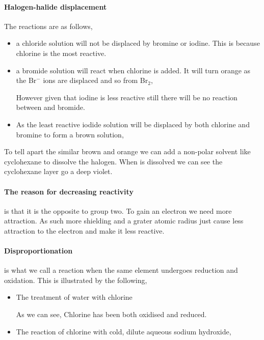 	\paragraph{Halogen-halide displacement} The reactions are as follows,
	\begin{itemize}
		\item a chloride solution will not be displaced by bromine or iodine. This is because chlorine is the most reactive.
		\item a bromide solution will react when chlorine is added. It will turn orange as the Br$^-$ ions are displaced and so from Br$_2$,
		
			However given that iodine is less reactive still there will be no reaction between  and bromide.
		\item As the least reactive iodide solution will be displaced by both chlorine and bromine to form a brown solution,
		
			
	\end{itemize}
	To tell apart the similar brown and orange we can add a non-polar solvent like cyclohexane to dissolve the halogen.
	When  is dissolved we can see the cyclohexane layer go a deep violet.
	
	\paragraph{The reason for decreasing reactivity} is that it is the opposite to group two.
	To gain an electron we need more attraction.
	As such more shielding and a grater atomic radius just cause less attraction to the electron and make it less reactive.
	
	\paragraph{Disproportionation} is what we call a reaction when the same element undergoes reduction and oxidation.
	This is illustrated by the following,
	\begin{itemize}
		\item The treatment of water with chlorine
		
		
		As we can see, Chlorine has been both oxidised and reduced.
		
		\item The reaction of chlorine with cold, dilute aqueous sodium hydroxide,
		
	\end{itemize}
	
